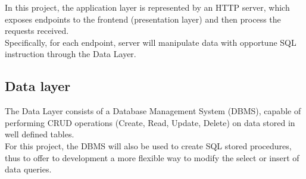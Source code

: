 \documentclass[conference]{IEEEtran}
\begin{document}
In this project, the application layer is represented by an HTTP server, which exposes endpoints to the frontend (presentation layer) and then process the requests received.
\\
Specifically, for each endpoint, server will manipulate data with opportune SQL instruction through the Data Layer.

\subsection{Data layer}

The Data Layer consists of a Database Management System (DBMS), capable of performing CRUD operations (Create, Read, Update, Delete) on data stored in well defined tables.
\\
For this project, the DBMS will also be used to create SQL stored procedures, thus to offer to development a more flexible way to modify the select or insert of data queries.
\end{document}
